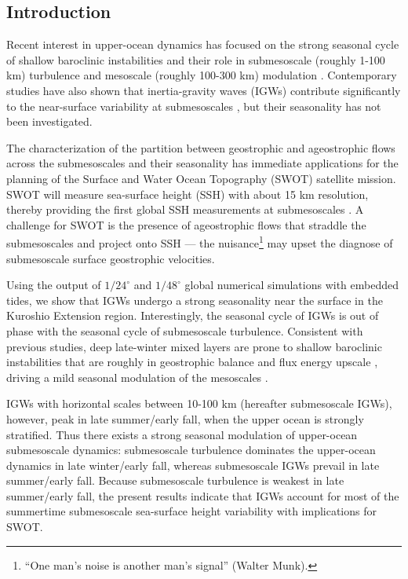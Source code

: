 \documentclass[grl]{agutex2015}
\begin{document}
\begin{article}

%
%

\section{Introduction}

Recent interest in upper-ocean dynamics has focused on the strong seasonal
cycle of shallow baroclinic instabilities and their role in submesoscale (roughly 1-100 km)
turbulence and mesoscale (roughly 100-300 km) modulation \citep{sasaki_etal2014,qiu_etal2014,
brannigan_etal2015,callies_etal2015, thompson_etal2016,buckingham_etal2016}. Contemporary studies
have also shown that inertia-gravity waves (IGWs) contribute significantly
to the near-surface variability at submesoscales \citep{richman_etal2012,
buhler_etal2014,rocha_etal2016}, but their seasonality has not been investigated.

The characterization of the partition between geostrophic and ageostrophic flows across
the submesoscales and their seasonality has immediate applications for the planning
of the Surface and Water Ocean Topography (SWOT) satellite mission.
SWOT will measure
sea-surface height (SSH) with about 15 km resolution, thereby providing the
first global SSH measurements at submesoscales \citep{fu_ubelmann2014}. A
challenge for SWOT is the presence of ageostrophic flows that straddle the submesoscales and project
onto SSH \citep[e.g., ][]{richman_etal2012} --- the
nuisance\footnote{``One man's noise is
another man's signal'' (Walter Munk).} may upset the diagnose
of submesoscale surface geostrophic velocities.

Using the output of $1/24^\circ$ and $1/48^\circ$ global
numerical simulations with embedded tides, we show that IGWs undergo
a strong seasonality near the surface in the Kuroshio Extension region.
Interestingly, the seasonal cycle of IGWs is out of phase
with the seasonal cycle of submesoscale turbulence. Consistent with previous studies,
deep late-winter mixed layers are prone to
shallow baroclinic instabilities that are roughly in geostrophic balance
and flux energy upscale \citep{sasaki_etal2014,callies_etal2016},
driving a mild seasonal modulation of the mesoscales \citep{sasaki_etal2014,qiu_etal2014}.

IGWs with horizontal scales between 10-100 km (hereafter submesoscale IGWs),
however, peak in late summer/early fall,
when the upper ocean is strongly stratified. Thus there exists a
strong seasonal modulation of upper-ocean submesoscale dynamics:
submesoscale turbulence dominates the upper-ocean dynamics in late winter/early fall,
whereas submesoscale IGWs prevail in late summer/early fall.
Because submesoscale turbulence is weakest in late summer/early fall,
the present results indicate that IGWs account for most of the
summertime submesoscale sea-surface height variability with implications for SWOT.


\end{article}
\end{document}
